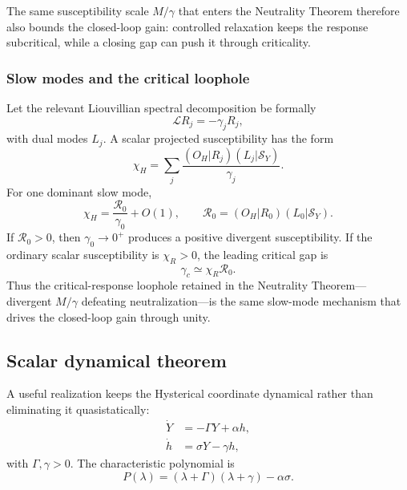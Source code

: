 \documentclass[11pt]{article}
\theoremstyle{definition}
\theoremstyle{remark}
\begin{document}
The same susceptibility scale $M/\gamma$ that enters the Neutrality Theorem therefore also bounds the closed-loop gain: controlled relaxation keeps the response subcritical, while a closing gap can push it through criticality.

\subsubsection{Slow modes and the critical loophole}
Let the relevant Liouvillian spectral decomposition be formally
\begin{equation}
 \mathcal L R_j=-\gamma_jR_j,
\end{equation}
with dual modes $L_j$.  A scalar projected susceptibility has the form
\begin{equation}
 \chi_H=\sum_j\frac{(O_H|R_j)(L_j|\mathcal S_Y)}{\gamma_j}.
\end{equation}
For one dominant slow mode,
\begin{equation}
 \boxed{\chi_H=\frac{\mathcal R_0}{\gamma_0}+O(1)},\qquad
 \mathcal R_0=(O_H|R_0)(L_0|\mathcal S_Y).
 \label{eq:slow}
\end{equation}
If $\mathcal R_0>0$, then $\gamma_0\to0^+$ produces a positive divergent susceptibility.  If the ordinary scalar susceptibility is $\chi_R>0$, the leading critical gap is
\begin{equation}
 \boxed{\gamma_c\simeq\chi_R\mathcal R_0.}
 \label{eq:gammac}
\end{equation}
Thus the critical-response loophole retained in the Neutrality Theorem---divergent $M/\gamma$ defeating neutralization---is the same slow-mode mechanism that drives the closed-loop gain through unity.

\subsection{Scalar dynamical theorem}\label{sec:scalar}
A useful realization keeps the Hysterical coordinate dynamical rather than eliminating it quasistatically:
\begin{align}
 \dot Y&=-\Gamma Y+\alpha h,\label{eq:scalarY}\\
 \dot h&=\sigma Y-\gamma h,\label{eq:scalarh}
\end{align}
with $\Gamma,\gamma>0$.  The characteristic polynomial is
\begin{equation}
 P(\lambda)=(\lambda+\Gamma)(\lambda+\gamma)-\alpha\sigma.
\end{equation}
\end{document}
